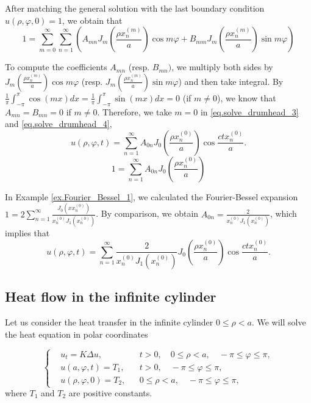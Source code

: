 After matching the general solution with the last boundary condition $u(\rho, \varphi, 0)=1$, we obtain that 
\begin{equation}\label{eq.solve_drumhead_4}
    1 = \sum_{m=0}^{\infty} \sum_{n=1}^{\infty}\left(A_{m n} J_m\left(\frac{\rho x_n^{(m)}}{a}\right) \cos m \varphi+B_{m m} J_m\left(\frac{\rho x_n^{(m)}}{a}\right) \sin m \varphi\right)
\end{equation}

To compute the coefficients $A_{m n}$ (resp. $B_{m n})$, we multiply both sides by $J_m\left(\frac{\rho x_n^{(m)}}{a}\right) \cos m \varphi$ (resp. $J_m\left(\frac{\rho x_n^{(m)}}{a}\right) \sin m \varphi$) and then take integral. By $\frac{1}{\pi} \int_{-\pi}^\pi \cos (m x) d x = \frac{1}{\pi} \int_{-\pi}^\pi \sin (m x) d x = 0$ (if $m\neq 0$), we know that $A_{m n} = B_{m n} = 0$ if $m\neq 0$. Therefore, we take $m = 0$ in \eqref{eq.solve_drumhead_3} and \eqref{eq.solve_drumhead_4},
$$
u(\rho, \varphi, t)=\sum_{n=1}^{\infty} A_{0 n} J_0\left(\frac{\rho x_n^{(0)}}{a}\right) \cos \frac{c t x_n^{(0)}}{a} .
$$
\[
    1 = \sum_{n=1}^{\infty} A_{0 n} J_0\left(\frac{\rho x_n^{(0)}}{a}\right)
\]


In Example \ref{ex.Fourier_Bessel_1}, we calculated the Fourier-Bessel expansion $1=2 \sum_{n=1}^{\infty} \frac{J_0\left(x x_n^{(0)}\right)}{x_n^{(0)} J_1\left(x_n^{(0)}\right)}$. By comparison, we obtain $A_{0n} = \frac{2}{x_n^{(0)} J_1\left(x_n^{(0)}\right)}$, which implies that
$$
u(\rho, \varphi, t)=\sum_{n=1}^{\infty} \frac{2}{x_n^{(0)} J_1\left(x_n^{(0)}\right)} J_0\left(\frac{\rho x_n^{(0)}}{a}\right) \cos \frac{c t x_n^{(0)}}{a} .
$$

\subsection{Heat flow in the infinite cylinder}
Let us consider the heat transfer in the infinite cylinder $0 \leq \rho<a$. We will solve the heat equation in polar coordinates

$$
\left\{\begin{aligned}
&u_t=K \Delta u, && t>0, \quad 0 \leq \rho<a, \quad-\pi \leq \varphi \leq \pi, 
\\
&u\left(a, \varphi, t\right)=T_1, && t>0, \quad-\pi \leq \varphi \leq \pi, 
\\
&u(\rho, \varphi, 0)=T_2, && 0 \leq \rho<a, \quad-\pi \leq \varphi \leq \pi,
\end{aligned}\right.
$$
where $T_1$ and $T_2$ are positive constants.

